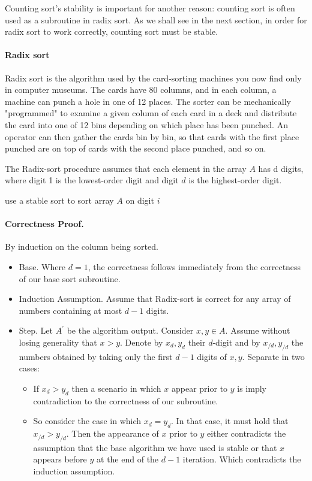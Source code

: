 Counting sort's stability is important for another reason: counting sort is often used as a subroutine in radix sort. As we shall see in the next section, in order for radix sort to work correctly, counting sort must be stable.

\paragraph{Radix sort}
Radix sort is the algorithm used by the card-sorting machines you now find only in computer museums. The cards have 80 columns, and in each column, a machine can punch a hole in one of 12 places. The sorter can be mechanically "programmed" to examine a given column of each card in a deck and distribute the card into one of 12 bins depending on which place has been punched. An operator can then gather the cards bin by bin, so that cards with the first place punched are on top of cards with the second place punched, and so on.

The Radix-sort procedure assumes that each element in the array $A$ has d digits, where digit 1 is the lowest-order digit and digit $d$ is the highest-order digit.



  \begin{algorithm}[H]
     {
        use a stable sort to sort array $A$ on digit $i$
    }
  \end{algorithm}


\paragraph{Correctness Proof.} By induction on the column being sorted.
\begin{itemize}
  \item Base. Where $d = 1$, the correctness follows immediately from the correctness of our base sort subroutine. 
  \item Induction Assumption. Assume that Radix-sort is correct for any array of numbers containing at most $d-1$ digits. 
  \item Step. Let $A^{\prime}$  be the algorithm output. Consider $x,y \in A$. Assume without losing generality that $x > y$. Denote by $x_{d}, y_{d}$ their $d$-digit and by $x_{/d}, y_{/d}$ the numbers obtained by taking only the first  $d-1$ digits of $x,y$. Separate in two cases:

    \begin{itemize}
      \item   If $x_{d} > y_{d}$ then a scenario in which $x$ appear prior to $y$ is  imply contradiction to the correctness of our subroutine.
      \item   So consider the case in which $x_{d} = y_{d}$. In that case, it must hold that $x_{/d} > y_{/d}$. Then the appearance of $x$ prior to $y$ either contradicts the assumption that the base algorithm we have used is stable or that $x$ appears before $y$ at the end of the $d-1$ iteration. Which contradicts the induction assumption. 
    \end{itemize}
 \end{itemize}

